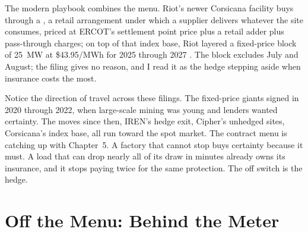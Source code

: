 The modern playbook combines the menu. Riot's newer Corsicana facility buys through a , a retail arrangement under which a supplier delivers whatever the site consumes, priced at ERCOT's settlement point price plus a retail adder plus pass-through charges; on top of that index base, Riot layered a fixed-price block of 25~MW at \$43.95/MWh for 2025 through 2027 \autocite{riot10k2024}. %
The block excludes July and August; the filing gives no reason, and I read it as the hedge stepping aside when insurance costs the most. %

Notice the direction of travel across these filings. The fixed-price giants signed in 2020 through 2022, when large-scale mining was young and lenders wanted certainty. The moves since then, IREN's hedge exit, Cipher's unhedged sites, Corsicana's index base, all run toward the spot market. The contract menu is catching up with Chapter~5. A factory that cannot stop buys certainty because it must. A load that can drop nearly all of its draw in minutes already owns its insurance, and it stops paying twice for the same protection. The off switch is the hedge.

\section{Off the Menu: Behind the Meter}
\label{sec:btm}

